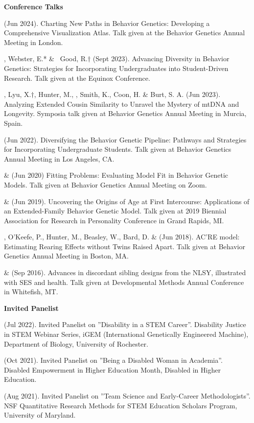 {\large {\bf Conference Talks}}\begin{etaremune}
\item \meb (Jun 2024). Charting New Paths in Behavior Genetics: Developing a Comprehensive \R Visualization Atlas. Talk given at the Behavior Genetics Annual Meeting in London.

\item \meb, Webster, E.* \& \ Good, R.$\dagger$ (Sept 2023). Advancing Diversity in Behavior Genetics: Strategies for Incorporating Undergraduates into Student-Driven Research. Talk given at the Equinox Conference.

\item \meb, Lyu, X.$\dagger$, Hunter, M.,  \Joe, Smith, K., Coon, H. \& Burt, S. A. (Jun 2023). Analyzing Extended Cousin Similarity to Unravel the Mystery of mtDNA and Longevity. Symposia talk given at Behavior Genetics Annual Meeting in Murcia, Spain.

\item \meb (Jun 2022). Diversifying the Behavior Genetic Pipeline: Pathways and Strategies for Incorporating Undergraduate Students. Talk given at Behavior Genetics Annual Meeting in Los Angeles, CA.

\item \meb \& \Joe (Jun 2020) Fitting Problems: Evaluating Model Fit in Behavior Genetic Models. Talk given at Behavior Genetics Annual Meeting on Zoom.
%
\item \meb \& \Joe (Jun 2019). Uncovering the Origins of Age at First Intercourse: Applications of an Extended-Family Behavior Genetic Model. Talk given at 2019 Biennial Association for Research in Personality Conference in Grand Rapids, MI.
%
\item\meb, O'Keefe, P., Hunter, M., Beasley, W., Bard, D. \& \Joe (Jun 2018). AC'RE model: Estimating Rearing Effects without Twins Raised Apart. Talk given at Behavior Genetics Annual Meeting in Boston, MA.
%
\item\meb \& \joe (Sep 2016). Advances in discordant sibling designs from the NLSY, illustrated with SES and health. Talk given at Developmental Methods Annual Conference in Whitefish, MT.%
%
\end{etaremune}
{\large \bf Invited Panelist}
\begin{etaremune}

\item \meb (Jul 2022). Invited Panelist on ''Disability in a STEM Career''. Disability Justice in STEM Webinar Series, iGEM (International Genetically Engineered Machine), Department of Biology, University of Rochester.
%
\item \meb (Oct 2021). Invited Panelist on ''Being a Disabled Woman in Academia''. Disabled Empowerment in Higher Education Month, Disabled in Higher Education.
%
\item \meb (Aug 2021). Invited Panelist on ''Team Science and Early-Career Methodologists''. NSF Quantitative Research Methods for STEM Education Scholars Program, University of Maryland.%
\end{etaremune}

